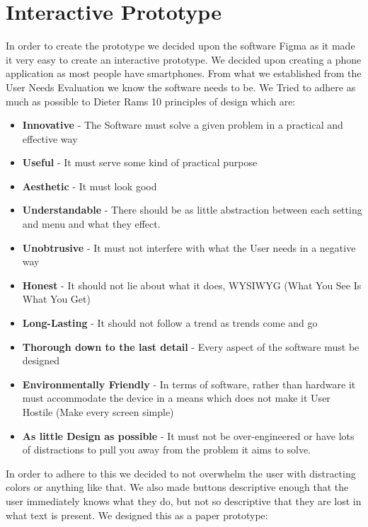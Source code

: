 \documentclass{article}
\begin{document}
	\section{Interactive Prototype}
	In order to create the prototype we decided upon the software Figma as it made it very easy to create an interactive prototype. We decided upon creating a phone application as most people have smartphones. From what we established from the User Needs Evaluation we know the software needs to be. We Tried to adhere as much as possible to Dieter Rams 10 principles of design which are:
	\begin{itemize}
		\item \textbf{Innovative} - The Software must solve a given problem in a practical and effective way
		\item \textbf{Useful} - It must serve some kind of practical purpose
		\item \textbf{Aesthetic} - It must look good
		\item \textbf{Understandable} - There should be as little abstraction between each setting and menu and what they effect.
		\item \textbf{Unobtrusive} - It must not interfere with what the User needs in a negative way
		\item \textbf{Honest} - It should not lie about what it does, WYSIWYG (What You See Is What You Get) 
		\item \textbf{Long-Lasting} - It should not follow a trend as trends come and go
		\item \textbf{Thorough down to the last detail} - Every aspect of the  software must be designed
		\item \textbf{Environmentally Friendly} - In terms of software, rather than hardware it must accommodate the device in a means which does not make it User Hostile (Make every screen simple)
		\item \textbf{As little Design as possible} - It must not be over-engineered or have lots of distractions to pull you away from the problem it aims to solve.
	\end{itemize}  
	In order to adhere to this we decided to not overwhelm the user with distracting colors or anything like that. We also made buttons descriptive enough that the user immediately knows what they do, but not so descriptive that they are lost in what text is present. We designed this as a paper prototype:
\end{document}
